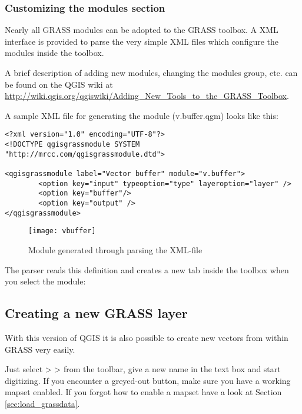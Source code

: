 \subsubsection{Customizing the modules section} 
\label{sec:toolbox-customizing}

Nearly all GRASS modules can be adopted to the GRASS toolbox. A XML interface is provided to parse
the very simple XML files which configure the modules inside the toolbox.

A brief description of adding new modules, changing the modules group, etc. can be found on the QGIS wiki
at \url{http://wiki.qgis.org/qgiswiki/Adding\_New\_Tools\_to\_the\_GRASS\_Toolbox}.

A sample XML file for generating the module  (v.buffer.qgm) looks like this:
\begin{verbatim}
<?xml version="1.0" encoding="UTF-8"?>
<!DOCTYPE qgisgrassmodule SYSTEM "http://mrcc.com/qgisgrassmodule.dtd">

<qgisgrassmodule label="Vector buffer" module="v.buffer">
        <option key="input" typeoption="type" layeroption="layer" />
        <option key="buffer"/>
        <option key="output" />
</qgisgrassmodule>
\end{verbatim}

\begin{figure}[ht]
\centering
\caption{Module generated through parsing the XML-file}\label{fig:buffer-module}
\texttt{[image: vbuffer]}
\end{figure}

The parser reads this definition and creates a new tab inside the toolbox when you select 
the module:


\subsection{Creating a new GRASS layer}\label{sec:creating_new_grass_vectors}

With this version of QGIS it is also possible to create new vectors from within GRASS very
easily.

Just select  >  > 
 from the toolbar, give a new name in the text box and start digitizing.
If you encounter a greyed-out button, make sure you have a working mapset enabled. If you forgot
how to enable a mapset have a look at Section \ref{sec:load_grassdata}.

